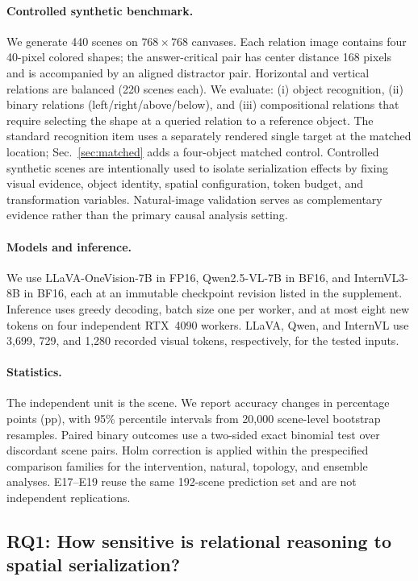 \documentclass[10pt,twocolumn,letterpaper]{article}
\begin{document}
\paragraph{Controlled synthetic benchmark.}
We generate 440 scenes on $768\!\times\!768$ canvases.
Each relation image contains four 40-pixel colored shapes; the answer-critical pair has center distance 168 pixels and is accompanied by an aligned distractor pair.
Horizontal and vertical relations are balanced (220 scenes each).
We evaluate: (i) object recognition, (ii) binary relations (left/right/above/below), and (iii) compositional relations that require selecting the shape at a queried relation to a reference object.
The standard recognition item uses a separately rendered single target at the matched location; Sec.~\ref{sec:matched} adds a four-object matched control.
Controlled synthetic scenes are intentionally used to isolate serialization effects by fixing visual evidence, object identity, spatial configuration, token budget, and transformation variables.
Natural-image validation serves as complementary evidence rather than the primary causal analysis setting.

\paragraph{Models and inference.}
We use LLaVA-OneVision-7B in FP16, Qwen2.5-VL-7B in BF16, and InternVL3-8B in BF16, each at an immutable checkpoint revision listed in the supplement.
Inference uses greedy decoding, batch size one per worker, and at most eight new tokens on four independent RTX~4090 workers.
LLaVA, Qwen, and InternVL use 3,699, 729, and 1,280 recorded visual tokens, respectively, for the tested inputs.

\paragraph{Statistics.}
The independent unit is the scene.
We report accuracy changes in percentage points (pp), with 95\% percentile intervals from 20,000 scene-level bootstrap resamples.
Paired binary outcomes use a two-sided exact binomial test over discordant scene pairs.
Holm correction is applied within the prespecified comparison families for the intervention, natural, topology, and ensemble analyses.
E17--E19 reuse the same 192-scene prediction set and are not independent replications.

\subsection{RQ1: How sensitive is relational reasoning to spatial serialization?}
\label{sec:crossmodel}
\end{document}
